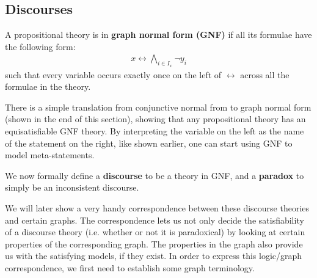 \subsection{Discourses}
\label{sub:Discourses}
A propositional theory is in \textbf{graph normal form (GNF)} if all its formulae have the following form:
\begin{align}
  x \leftrightarrow \bigwedge_{i \in I_x} \neg y_i
\end{align}
such that every variable occurs exactly once on the left of $\leftrightarrow$ across all the formulae in the theory.

There is a simple translation from conjunctive normal from to graph normal form (shown in the end of this section), showing that any propositional theory has an equisatisfiable GNF theory.
By interpreting the variable on the left as the name of the statement on the right, like shown earlier, one can start using GNF to model meta-statements.

We now formally define a \textbf{discourse} to be a theory in GNF, and a \textbf{paradox} to simply be an inconsistent discourse.

We will later show a very handy correspondence between these discourse theories and certain graphs.
The correspondence lets us not only decide the satisfiability of a discourse theory (i.e. whether or not it is paradoxical) by looking at certain properties of the corresponding graph.
The properties in the graph also provide us with the satisfying models, if they exist.
In order to express this logic/graph correspondence, we first need to establish some graph terminology.
